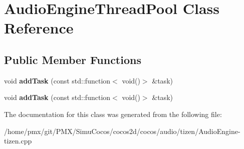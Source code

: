 \hypertarget{classAudioEngineThreadPool}{}\section{Audio\+Engine\+Thread\+Pool Class Reference}
\label{classAudioEngineThreadPool}
\subsection*{Public Member Functions}
\begin{DoxyCompactItemize}
\item 
\mbox{\label{classAudioEngineThreadPool_ab050a51075f6656bfcac20676787cd04}} 
void {\bfseries add\+Task} (const std\+::function$<$ void()$>$ \&task)
\item 
\mbox{\label{classAudioEngineThreadPool_ab050a51075f6656bfcac20676787cd04}} 
void {\bfseries add\+Task} (const std\+::function$<$ void()$>$ \&task)
\end{DoxyCompactItemize}


The documentation for this class was generated from the following file\+:\begin{DoxyCompactItemize}
\item 
/home/pmx/git/\+P\+M\+X/\+Simu\+Cocos/cocos2d/cocos/audio/tizen/Audio\+Engine-\/tizen.\+cpp\end{DoxyCompactItemize}

